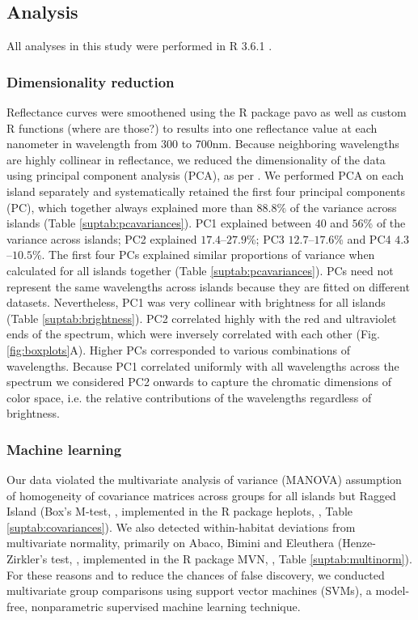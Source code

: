 \subsection*{Analysis}

All analyses in this study were performed in R 3.6.1 \citep{RCoreTeam2019}. 

\subsubsection*{Dimensionality reduction}

Reflectance curves were smoothened using the R package pavo \citep{Maia2013} as well as custom R functions (where are those?) to results into one reflectance value at each nanometer in wavelength from 300 to 700nm. Because neighboring wavelengths are highly collinear in reflectance, we reduced the dimensionality of the data using principal component analysis (PCA), as per \citet{Cuthill1999, Leal2002}. We performed PCA on each island separately and systematically retained the first four principal components (PC), which together always explained more than $88.8\%$ of the variance across islands (Table \ref{suptab:pcavariances}). PC1 explained between $40$ and $56$\% of the variance across islands; PC2 explained $17.4$--$27.9$\%; PC3 $12.7$--$17.6$\% and PC4 $4.3$--$10.5$\%. The first four PCs explained similar proportions of variance when calculated for all islands together (Table \ref{suptab:pcavariances}). PCs need not represent the same wavelengths across islands because they are fitted on different datasets. Nevertheless, PC1 was very collinear with brightness for all islands (Table \ref{suptab:brightness}). PC2 correlated highly with the red and ultraviolet ends of the spectrum, which were inversely correlated with each other (Fig. \ref{fig:boxplots}A). Higher PCs corresponded to various combinations of wavelengths. Because PC1 correlated uniformly with all wavelengths across the spectrum  we considered PC2 onwards to capture the chromatic dimensions of color space, i.e. the relative contributions of the wavelengths regardless of brightness.

\subsubsection*{Machine learning}

Our data violated the multivariate analysis of variance (MANOVA) assumption of homogeneity of covariance matrices across groups for all islands but Ragged Island (Box's M-test, \citealt{Box1949, Morrison1988}, implemented in the R package heplots, \citealt{Fox2018},  Table \ref{suptab:covariances}). We also detected within-habitat deviations from multivariate normality, primarily on Abaco, Bimini and Eleuthera (Henze-Zirkler's test, \citealt{Henze1990}, implemented in the R package MVN, \citealt{Korkmaz2014}, Table \ref{suptab:multinorm}). For these reasons and to reduce the chances of false discovery, we conducted multivariate group comparisons using support vector machines (SVMs), a model-free, nonparametric supervised machine learning technique.\\

